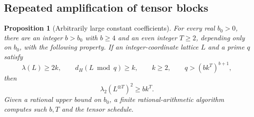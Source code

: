 \documentclass[11pt,letterpaper]{article}
\numberwithin{equation}{section}
\newtheorem{proposition}[theorem]{Proposition}
\theoremstyle{definition}
\theoremstyle{remark}
\begin{document}
\subsection{Repeated amplification of tensor blocks}
\begin{proposition}[Arbitrarily large constant coefficients]\label{prop:schedule}
For every real $b_0>0$, there are an integer $b>b_0$ with $b\ge4$ and an even integer $T\ge2$, depending only on $b_0$, with the following property. If an integer-coordinate lattice $L$ and a prime $q$ satisfy
\begin{equation}\label{eq:schedule-hypotheses}
 \lambda(L)\ge2k,\qquad d_H(L\bmod q)\ge k,\qquad k\ge2,
 \qquad q>(bk^T)^{b+1},
\end{equation}
then
\begin{equation}\label{eq:schedule-conclusion}
 \lambda_2(L^{\otimes T})^2\ge bk^T.
\end{equation}
Given a rational upper bound on $b_0$, a finite rational-arithmetic algorithm computes such $b,T$ and the tensor schedule.
\end{proposition}
\end{document}
